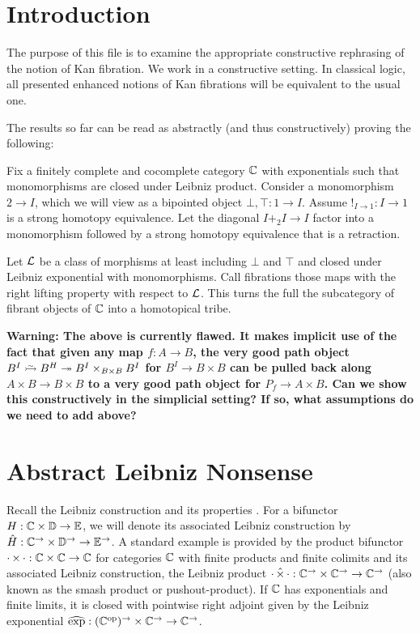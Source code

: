 \documentclass[reqno,10pt,a4paper,oneside]{amsart}
\begin{document}
\section{Introduction}

The purpose of this file is to examine the appropriate constructive rephrasing of the notion of Kan fibration.
We work in a constructive setting.
In classical logic, all presented enhanced notions of Kan fibrations will be equivalent to the usual one. 

The results so far can be read as abstractly (and thus constructively) proving the following:

\begin{theorem}
\label{abstract-homotopical-tribe}
Fix a finitely complete and cocomplete category $\mathbb{C}$ with exponentials such that monomorphisms are closed under Leibniz product.
Consider a monomorphism $2 \to I$, which we will view as a bipointed object $\bot, \top : 1 \to I$.
Assume $!_{I \to 1} : I \to 1$ is a strong homotopy equivalence.
Let the diagonal $I +_2 I \to I$ factor into a monomorphism followed by a strong homotopy equivalence that is a retraction.

Let $\mathcal{L}$ be a class of morphisms at least including $\bot$ and $\top$ and closed under Leibniz exponential with monomorphisms.
Call fibrations those maps with the right lifting property with respect to $\mathcal{L}$.
This turns the full the subcategory of fibrant objects of $\mathbb{C}$ into a homotopical tribe.
\end{theorem}

\textbf{Warning:
The above is currently flawed.
It makes implicit use of the fact that given any map $f : A \to B$, the very good path object $B^I \acof B^H \fib B^I \times_{B \times B} B^I$ for $B^I \to B \times B$ can be pulled back along $A \times B \to B \times B$ to a very good path object for $P_f \to A \times B$.
Can we show this constructively in the simplicial setting?
If so, what assumptions do we need to add above?
}

\section{Abstract Leibniz Nonsense}

Recall the Leibniz construction and its properties \cite[Section 4]{riehl-verity:reedy}.
For a bifunctor $H : \mathbb{C} \times \mathbb{D} \to \mathbb{E}$, we will denote its associated Leibniz construction by $\hat{H} : \mathbb{C}^{\to} \times \mathbb{D}^{\to} \to \mathbb{E}^{\to}$.
A standard example is provided by the product bifunctor $\mathop{\cdot} \times \mathop{\cdot} : \mathbb{C} \times \mathbb{C} \to \mathbb{C}$ for categories $\mathbb{C}$ with finite products and finite colimits and its associated Leibniz construction, the Leibniz product $\mathop{\cdot} \mathbin{\hat{\times}} \mathop{\cdot} : \mathbb{C}^{\to} \times \mathbb{C}^{\to} \to \mathbb{C}^{\to}$ (also known as the smash product or pushout-product).
If $\mathbb{C}$ has exponentials and finite limits, it is closed with pointwise right adjoint given by the Leibniz exponential $\operatorname{\widehat{exp}} : (\mathbb{C}^{\mathrm{op}})^{\to} \times \mathbb{C}^{\to} \to \mathbb{C}^{\to}$.
\end{document}

